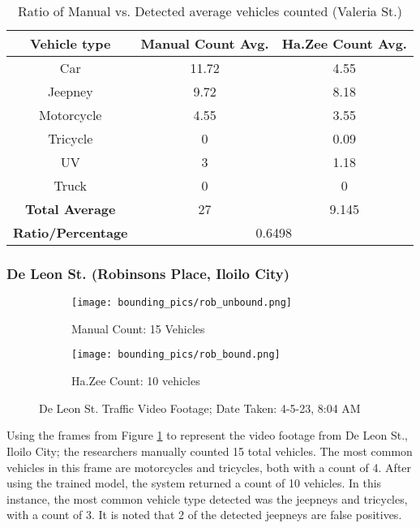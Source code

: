 \begin{table}[ht]   %
	\centering
	\caption{Ratio of Manual vs. Detected average vehicles counted  (Valeria St.)} \vspace{0.25em}
	\begin{tabular}{c|c|c} \hline
		\centering \textbf {Vehicle type} & \textbf{Manual Count Avg.} & \textbf{Ha.Zee Count Avg.} \\ \hline
		Car & 11.72 & 4.55   \\ 
		Jeepney & 9.72 & 8.18  	\\ 
		Motorcycle& 4.55  & 3.55   \\ 
		Tricycle   & 0  & 0.09  \\ 
		UV & 3 & 1.18  \\ 
		Truck & 0 & 0 \\ \hline
		
		\textbf{Total Average} &27 & 9.145\\ \hline
		\textbf{Ratio/Percentage} & \multicolumn{2}{c}{0.6498}  \\ \hline
		
	\end{tabular}
	\label{tab:valeria_st}
\end{table}

\newpage
\subsubsection{De Leon St.  (Robinsons Place, Iloilo City)
}


\begin{figure}[!htbp]
	\begin{subfigure}{.5\textwidth}
		\centering
		\texttt{[image: bounding\_pics/rob\_unbound.png]}
		\caption{Manual Count: 15 Vehicles}
		
	\end{subfigure}%
	\begin{subfigure}{.5\textwidth}
		\centering
		\texttt{[image: bounding\_pics/rob\_bound.png]}
		\caption{Ha.Zee Count: 10 vehicles}
	\end{subfigure}
	\caption{De Leon St. Traffic Video Footage; Date Taken: 4-5-23, 8:04 AM}
	\label{fig:de_leon}
\end{figure}
\FloatBarrier

Using the frames from Figure \ref{fig:de_leon} to represent the video footage from De Leon St., Iloilo City; the researchers manually counted 15 total vehicles. The most common vehicles in this frame are motorcycles and tricycles, both with a count of 4. After using the trained model, the system returned a count of 10 vehicles. In this instance, the most common vehicle type detected was the jeepneys and tricycles, with a count of 3. It is noted that 2 of the detected jeepneys are false positives.

